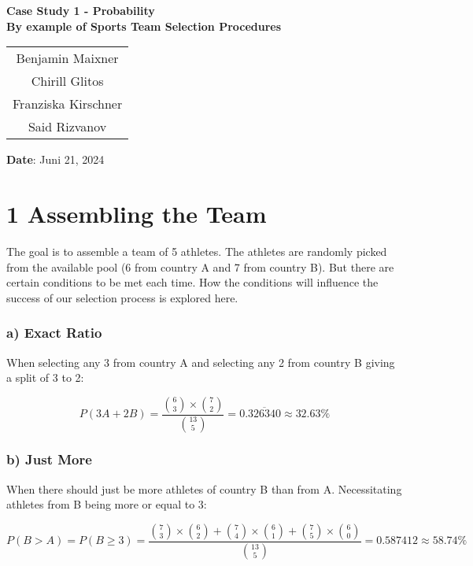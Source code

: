 \documentclass[
]{article}
\author{}
\date{\vspace{-2.5em}}
\begin{document}
\thispagestyle{empty}

\begin{center}
  \vspace*{2cm}
  \Huge\textbf{Case Study 1 - Probability} \\[0.5cm]
  \Large\textbf{By example of Sports Team Selection Procedures} \\[1cm]
  \large
  \begin{tabular}{c}
    Benjamin Maixner \\
    Chirill Glitos \\
    Franziska Kirschner \\
    Said Rizvanov \\
  \end{tabular}
  \vfill
  \normalsize
  \textbf{Date}: Juni 21, 2024
\end{center}

\newpage

\section{1 Assembling the Team}\label{assembling-the-team}

The goal is to assemble a team of 5 athletes. The athletes are randomly
picked from the available pool (6 from country A and 7 from country B).
But there are certain conditions to be met each time. How the conditions
will influence the success of our selection process is explored here.

\subsubsection{a) Exact Ratio}\label{a-exact-ratio}

When selecting any 3 from country A and selecting any 2 from country B
giving a split of 3 to 2:

\[
P(3A + 2B) = \frac{\binom{6}{3} \times \binom{7}{2}}{\binom{13}{5}} = 0.\overline{326340} \approx 32.63\%
\]

\subsubsection{b) Just More}\label{b-just-more}

When there should just be more athletes of country B than from A.
Necessitating athletes from B being more or equal to 3:

\[
P(B > A) = P(B \geq 3) = \frac{\binom{7}{3} \times \binom{6}{2} + \binom{7}{4} \times \binom{6}{1} + \binom{7}{5} \times \binom{6}{0}}{\binom{13}{5}} = 0.587412 \approx 58.74\%
\]
\end{document}

